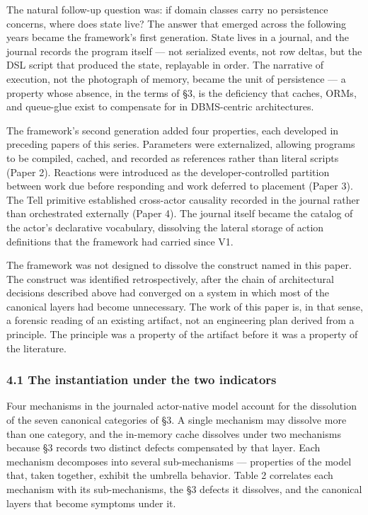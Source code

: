 \documentclass[
]{article}
\begin{document}
The natural follow-up question was: if domain classes carry no
persistence concerns, where does state live? The answer that emerged
across the following years became the framework's first generation.
State lives in a journal, and the journal records the program itself ---
not serialized events, not row deltas, but the DSL script that produced
the state, replayable in order. The narrative of execution, not the
photograph of memory, became the unit of persistence --- a property
whose absence, in the terms of §3, is the deficiency that caches, ORMs,
and queue-glue exist to compensate for in DBMS-centric architectures.

The framework's second generation added four properties, each developed
in preceding papers of this series. Parameters were externalized,
allowing programs to be compiled, cached, and recorded as references
rather than literal scripts (Paper 2). Reactions were introduced as the
developer-controlled partition between work due before responding and
work deferred to placement (Paper 3). The Tell primitive established
cross-actor causality recorded in the journal rather than orchestrated
externally (Paper 4). The journal itself became the catalog of the
actor's declarative vocabulary, dissolving the lateral storage of action
definitions that the framework had carried since V1.

The framework was not designed to dissolve the construct named in this
paper. The construct was identified retrospectively, after the chain of
architectural decisions described above had converged on a system in
which most of the canonical layers had become unnecessary. The work of
this paper is, in that sense, a forensic reading of an existing
artifact, not an engineering plan derived from a principle. The
principle was a property of the artifact before it was a property of the
literature.

\subsubsection{4.1 The instantiation under the two
indicators}\label{the-instantiation-under-the-two-indicators}

Four mechanisms in the journaled actor-native model account for the
dissolution of the seven canonical categories of §3. A single mechanism
may dissolve more than one category, and the in-memory cache dissolves
under two mechanisms because §3 records two distinct defects compensated
by that layer. Each mechanism decomposes into several sub-mechanisms ---
properties of the model that, taken together, exhibit the umbrella
behavior. Table 2 correlates each mechanism with its sub-mechanisms, the
§3 defects it dissolves, and the canonical layers that become symptoms
under it.
\end{document}
